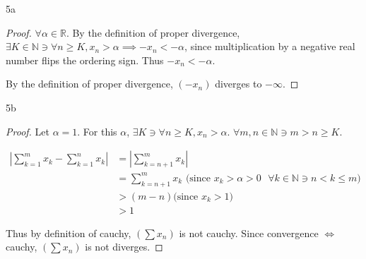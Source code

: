 \documentclass{article}
\newcommand{\R}{\mathbb{R}}
\newcommand{\N}{\mathbb{N}}
\newcommand{\abs}[1]{\left\lvert #1\right\rvert}
\begin{document}
\bigskip
\begin{PROB}{5a}\label{Problem 5a.}
\end{PROB}
\begin{proof}
    $\forall \alpha \in \R$. By the definition of proper divergence, $\exists K \in \N \ni \forall n \geq K, x_n > \alpha \implies -x_n < -\alpha$, since multiplication by a negative real number flips the ordering sign. Thus $-x_n < -\alpha$. 
    
    By the definition of proper divergence, $(-x_n)$ diverges to $- \infty$.  
\end{proof}
\begin{PROB}{5b}\label{Problem 5b.}  
\end{PROB}
\begin{proof}
    Let $\alpha = 1$. For this $\alpha$, $\exists K \ni \forall n \geq K, x_n > \alpha$. $\forall m, n \in \N \ni m > n \geq K$. 
    
    \begin{align*}
        \abs{\sum_{k = 1}^{m}x_k - \sum_{k = 1}^{n}x_k} &= \abs{\sum_{k = n + 1}^{m}x_k} \\
        &= \sum_{k = n + 1}^{m}x_k \text{ (since $x_k > \alpha > 0$ $\forall k \in \N \ni n < k \leq m$)} \\
        &> (m - n) \text{(since $x_k > 1$)} \\
        &> 1
    \end{align*}

    Thus by definition of cauchy, $(\sum x_n)$ is not cauchy. Since convergence $\iff$ cauchy, $(\sum x_n)$ is not diverges.  
\end{proof}
\end{document}
